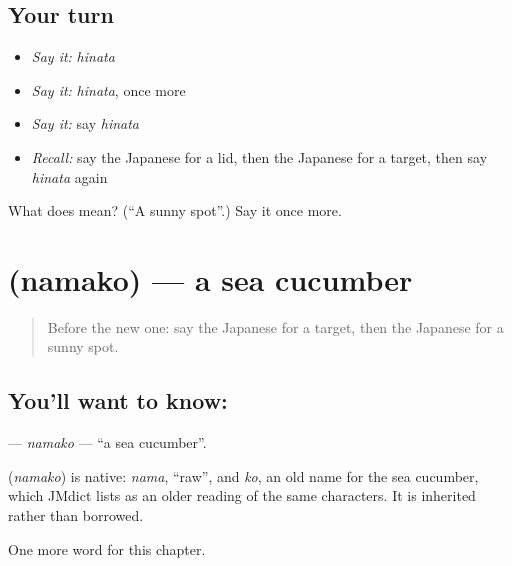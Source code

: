\subsection*{Your turn}
\begin{itemize}
\raggedright
  \item \emph{Say it:} \emph{hinata}
  \item \emph{Say it:} \emph{hinata}, once more
  \item \emph{Say it:} say \emph{hinata}
  \item \emph{Recall:} say the Japanese for a lid, then the Japanese for a target, then say \emph{hinata} again
\end{itemize}

\begin{tcolorbox}[breakable,colback=teal!4,colframe=teal!35!black,title={Before you move on}]
What does  mean? (\textquotedblleft{}A sunny spot\textquotedblright{}.) Say it once more.
\end{tcolorbox}
\section[\texorpdfstring{\ja{なまこ} (namako)}{なまこ (namako)}]{ (namako) — a sea cucumber}

\label{lesson:JA-C115-namako}



\begin{quote}
Before the new one: say the Japanese for a target, then the Japanese for a sunny spot.
\end{quote}

\subsection*{You'll want to know: }
\textbf{} — \emph{namako} — \textquotedblleft{}a sea cucumber\textquotedblright{}.

\begin{cousinweb}
\textbf{} (\emph{namako}) is native: \emph{nama}, \textquotedblleft{}raw\textquotedblright{}, and \emph{ko}, an old name for the sea cucumber, which JMdict lists as an older reading of the same characters. It is inherited rather than borrowed.
\end{cousinweb}

\begin{grammarlens}[title={What you've built}]
One more word for this chapter.
\end{grammarlens}

